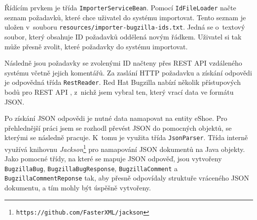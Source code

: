 \documentclass[11pt,oneside]{fithesis2}
\begin{document}
Řídícím prvkem je třída \texttt{ImporterServiceBean}. Pomocí \texttt{IdFileLoader} načte seznam požadavků, které chce uživatel do systému importovat. Tento seznam je uložen v~souboru \texttt{resources/importer-bugzilla-ids.txt}. Jedná se o~textový soubor, který obsahuje ID požadavků oddělená novým řádkem. Uživatel si tak může přesně zvolit, které požadavky do systému importovat. 

Následně jsou požadavky se zvolenými ID načteny přes REST API vzdáleného systému včetně jejich komentářů. Za zaslání HTTP požadavku a získání odpovědi je odpovědná třída \texttt{RestReader}. Red Hat Bugzilla nabízí několik přístupových bodů pro REST API \cite{Bugzilla}, z~nichž jsem vybral ten, který vrací data ve formátu JSON.

Po získání JSON odpovědi je nutné data namapovat na entity eShoe. Pro přehlednější práci jsem se rozhodl převést JSON do pomocných objektů, se kterými se následně pracuje. K~tomu je využita třída \texttt{JsonParser}. Třída interně využívá knihovnu \emph{Jackson}\footnote{\texttt{https://github.com/FasterXML/jackson}} pro namapování JSON dokumentů na Java objekty. Jako pomocné třídy, na které se mapuje JSON odpověď, jsou vytvořeny \texttt{BugzillaBug}, \texttt{BugzillaBugResponse}, \texttt{BugzillaComment} a \texttt{BugzillaCommentReponse} tak, aby přesně odpovídaly struktuře vráceného JSON dokumentu, a tím mohly být úspěšně vytvořeny.
\end{document}
